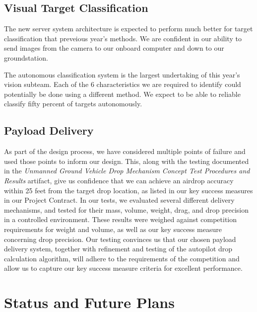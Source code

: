 \documentclass[]{auvsi_doc}
\begin{document}
\subsection{Visual Target Classification}
The new server system architecture is expected to perform much better for target classification that preveious year's methods. We are
confident in our ability to send images from the camera to our onboard computer and down to our groundstation.

The autonomous classification system is the largest undertaking of this year's vision subteam. Each of the 6 characteristics we are
required to identify could potentially be done using a different method. We expect to be able to reliable classify fifty percent of
targets autonomously.
\subsection{Payload Delivery}
As part of the design process, we have considered multiple points of failure and used those points to inform our design. This, along with the testing documented in the \textit{Unmanned Ground Vehicle Drop Mechanism Concept Test Procedures and Results} artifact, give us confidence that we can achieve an airdrop accuracy within 25 feet from the target drop location, as listed in our key success measures in our Project Contract. In our tests, we evaluated several different delivery mechanisms, and tested for their mass, volume, weight, drag, and drop precision in a controlled environment. These results were weighed against competition requirements for weight and volume, as well as our key success measure concerning drop precision. Our testing convinces us that our chosen payload delivery system, together with refinement and testing of the autopilot drop calculation algorithm, will adhere to the requirements of the competition and allow us to capture our key success measure criteria for excellent performance.
\section{Status and Future Plans}
\end{document}
